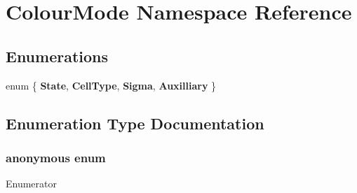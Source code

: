 \section{Colour\-Mode Namespace Reference}
\label{namespaceColourMode}
\subsection*{Enumerations}
\begin{DoxyCompactItemize}
\item 
enum \{ {\bf State}, 
{\bf Cell\-Type}, 
{\bf Sigma}, 
{\bf Auxilliary}
 \}
\end{DoxyCompactItemize}


\subsection{Enumeration Type Documentation}
\subsubsection[{anonymous enum}]{\setlength{\rightskip}{0pt plus 5cm}anonymous enum}\label{namespaceColourMode_a3ec2d96e1ab9b4099be0dbd869bc629e}
\begin{Desc}
\item[Enumerator]\par
\begin{description}
\item[{\em 
State\label{namespaceColourMode_a3ec2d96e1ab9b4099be0dbd869bc629eaa583b45a74be0e904996865c18be8883}
}]\item[{\em 
Cell\-Type\label{namespaceColourMode_a3ec2d96e1ab9b4099be0dbd869bc629ea5d77678785d03216a2e858e7bbc02db3}
}]\item[{\em 
Sigma\label{namespaceColourMode_a3ec2d96e1ab9b4099be0dbd869bc629ea55ba6056ec9c4d7abecf1bf39c7c9d5e}
}]\item[{\em 
Auxilliary\label{namespaceColourMode_a3ec2d96e1ab9b4099be0dbd869bc629ea462975a5d384404d59394e97552b0e8a}
}]\end{description}
\end{Desc}
